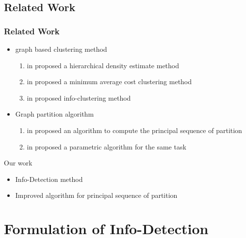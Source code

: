 \documentclass[notheorems]{beamer}
\begin{document}
\subsection{Related Work}
\begin{frame}
	\frametitle{Related Work}
\begin{itemize}
\item graph based clustering method
	\begin{enumerate}
		\item \citeauthor{de} in \citeyear{de} proposed a hierarchical density estimate method 
		\item \citeauthor{mac} in \citeyear{mac} proposed a minimum average cost clustering method 
		\item \citeauthor{ic} in \citeyear{ic} proposed info-clustering method
	\end{enumerate}
\item Graph partition algorithm
\begin{enumerate}
\item \citeauthor{psp} in \citeyear{psp} proposed an algorithm to compute the principal sequence of partition 
\item \citeauthor{pmf} in \citeyear{pmf} proposed a parametric algorithm for the same task 
\end{enumerate}
\end{itemize}
Our work
\begin{itemize}
\item Info-Detection method
\item Improved algorithm for principal sequence of partition
\end{itemize}
\end{frame}
\section{Formulation of Info-Detection}
\end{document}
